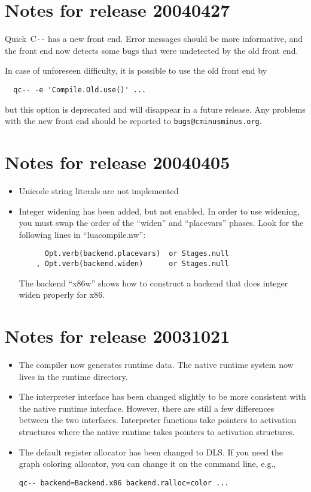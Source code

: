 \documentclass{article}
\def\PAL{\mbox{C{\texttt{-{}-}}}}
\begin{document}
\section{Notes for release 20040427}

Quick~{\PAL} has a new front end.
Error messages should be more informative, and the front end now
detects some bugs that were undetected by the old front end.

In case of unforeseen difficulty, it is possible to use the old front
end by
\begin{verbatim}
  qc-- -e 'Compile.Old.use()' ...
\end{verbatim}
but this option is deprecated and will disappear in a future release.
Any problems with the new front end should be reported to
\texttt{bugs@cminusminus.org}. 


\section{Notes for release 20040405}
\begin{itemize}
\item
Unicode string literals are not implemented

\item Integer widening has been added, but not enabled.
In order to use widening, you must swap the order of the
``widen'' and ``placevars'' phases.  Look for the following lines in
``luacompile.nw'':
\begin{verbatim}
      Opt.verb(backend.placevars)  or Stages.null
    , Opt.verb(backend.widen)      or Stages.null
\end{verbatim}
The backend ``x86w'' shows how to construct a backend that does
integer widen properly for x86.

\end{itemize}



\section{Notes for release 20031021}
\begin{itemize}
\item
The compiler now generates runtime data. The native runtime system now
lives in the runtime directory.
\item
The interpreter interface has been changed slightly to be more
consistent with the native runtime interface. However, there are still
a few differences between the two interfaces. Interpreter functions
take pointers to activation structures where the native runtime takes
pointers to activation structures.
\item
The default register allocator has been changed to DLS. If you need
the graph coloring allocator, you can change it on the command line,
e.g.,
\begin{verbatim}
qc-- backend=Backend.x86 backend.ralloc=color ...
\end{verbatim}


\end{itemize}
\end{document}
